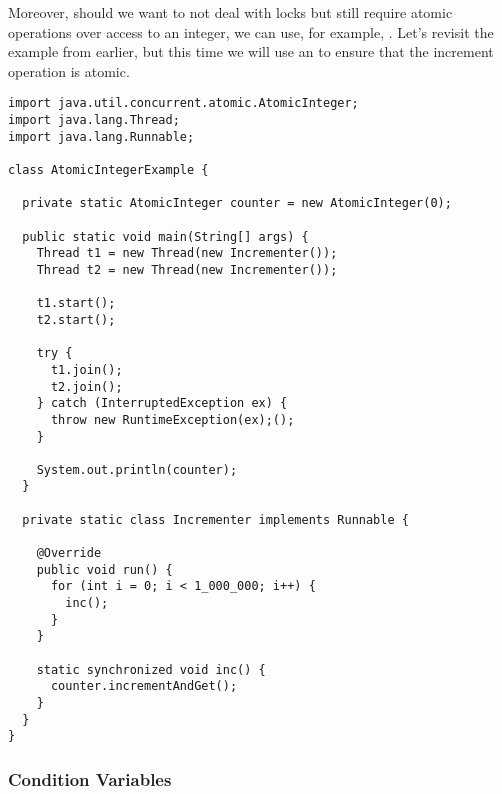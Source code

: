 Moreover, should we want to not deal with locks but still require atomic operations over access to an integer, we can use, for example, . 
Let's revisit the  example from earlier, but this time we will use an  to ensure that the increment operation is atomic.

\begin{lstlisting}[language=MyJava]
import java.util.concurrent.atomic.AtomicInteger;
import java.lang.Thread;
import java.lang.Runnable;

class AtomicIntegerExample {

  private static AtomicInteger counter = new AtomicInteger(0);

  public static void main(String[] args) {
    Thread t1 = new Thread(new Incrementer());
    Thread t2 = new Thread(new Incrementer());

    t1.start();
    t2.start();

    try {
      t1.join();
      t2.join();
    } catch (InterruptedException ex) { 
      throw new RuntimeException(ex);(); 
    }

    System.out.println(counter);
  }

  private static class Incrementer implements Runnable {

    @Override
    public void run() {
      for (int i = 0; i < 1_000_000; i++) { 
        inc(); 
      }
    }

    static synchronized void inc() {
      counter.incrementAndGet();
    }
  }
}
\end{lstlisting}



\subsubsection*{Condition Variables}

